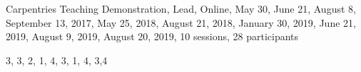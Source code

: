 \item Carpentries Teaching Demonstration, Lead, Online, May 30, June 21,
August 8, September 13, 2017, May 25, 2018, August 21, 2018, January 30, 2019, June 21, 2019,
August 9, 2019,  August 20, 2019, 10 sessions, 28 participants



3, 3, 2, 1, 4, 3, 1, 4, 3,4
